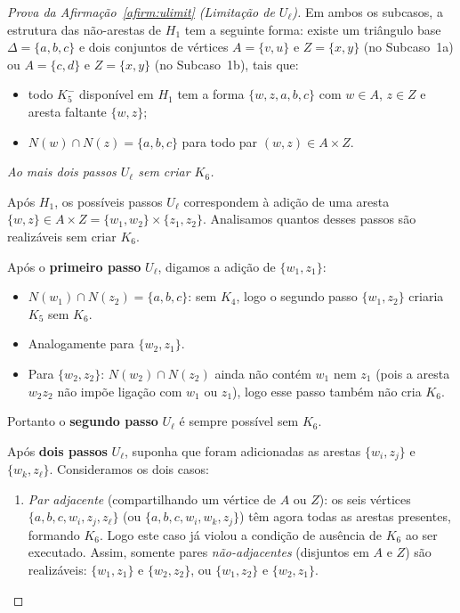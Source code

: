 \documentclass[reqno, 12pt]{amsart}
\numberwithin{equation}{section}
\theoremstyle{plain}
\theoremstyle{definition}
\begin{document}
\begin{proof}[Prova da Afirmação~\ref{afirm:ulimit} (Limitação de $U_\ell$)]
\medskip
Em ambos os subcasos, a estrutura das não-arestas de $H_1$ tem a seguinte forma:
existe um triângulo base $\Delta = \{a,b,c\}$ e dois conjuntos de vértices
$A = \{v, u\}$ e $Z = \{x, y\}$ (no Subcaso~1a) ou $A = \{c,d\}$ e $Z = \{x,y\}$
(no Subcaso~1b), tais que:
\begin{itemize}
  \item todo $K_5^-$ disponível em $H_1$ tem a forma $\{w,z,a,b,c\}$ com
        $w \in A$, $z \in Z$ e aresta faltante $\{w,z\}$;
  \item $N(w) \cap N(z) = \{a,b,c\}$ para todo par $(w,z) \in A \times Z$.
\end{itemize}

\medskip
\noindent\textit{Ao mais dois passos $U_\ell$ sem criar $K_6$.}

Após $H_1$, os possíveis passos $U_\ell$ correspondem à adição de uma aresta
$\{w,z\} \in A \times Z = \{w_1,w_2\} \times \{z_1,z_2\}$. Analisamos quantos
desses passos são realizáveis sem criar $K_6$.

\medskip
Após o \textbf{primeiro passo} $U_\ell$, digamos a adição de $\{w_1, z_1\}$:
\begin{itemize}
  \item $N(w_1) \cap N(z_2) = \{a,b,c\}$: sem $K_4$, logo o segundo passo
        $\{w_1,z_2\}$ criaria $K_5$ sem $K_6$. \checkmark
  \item Analogamente para $\{w_2,z_1\}$.
  \item Para $\{w_2,z_2\}$: $N(w_2) \cap N(z_2)$ ainda não contém $w_1$ nem $z_1$
        (pois a aresta $w_2 z_2$ não impõe ligação com $w_1$ ou $z_1$),
        logo esse passo também não cria $K_6$. \checkmark
\end{itemize}
Portanto o \textbf{segundo passo} $U_\ell$ é sempre possível sem $K_6$.

\medskip
Após \textbf{dois passos} $U_\ell$, suponha que foram adicionadas as arestas
$\{w_i, z_j\}$ e $\{w_k, z_\ell\}$. Consideramos os dois casos:

\begin{enumerate}
  \item \emph{Par adjacente} (compartilhando um vértice de $A$ ou $Z$):
    os seis vértices $\{a,b,c,w_i,z_j,z_\ell\}$ (ou $\{a,b,c,w_i,w_k,z_j\}$)
    têm agora todas as arestas presentes, formando $K_6$. Logo este caso já violou
    a condição de ausência de $K_6$ ao ser executado. Assim, somente pares
    \emph{não-adjacentes} (disjuntos em $A$ e $Z$) são realizáveis: $\{w_1,z_1\}$
    e $\{w_2,z_2\}$, ou $\{w_1,z_2\}$ e $\{w_2,z_1\}$.


\end{enumerate}
\end{proof}
\end{document}
